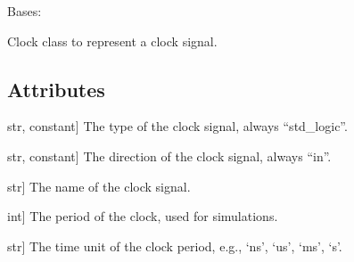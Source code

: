 \documentclass[letterpaper,10pt,english]{sphinxmanual}
\begin{document}
\begin{fulllineitems}
\label{\detokenize{a_signal:a_signal.Clock}}
\pysigstartsignatures
{}
\pysigstopsignatures
\sphinxAtStartPar
Bases: {\hyperref[\detokenize{a_signal:a_signal.Signal}]{}}

\sphinxAtStartPar
Clock class to represent a clock signal.


\subsection{Attributes}
\label{\detokenize{a_signal:attributes}}\begin{description}
\sphinxlineitem{type}{[}str, constant{]}
\sphinxAtStartPar
The type of the clock signal, always “std\_logic”.

\sphinxlineitem{direction}{[}str, constant{]}
\sphinxAtStartPar
The direction of the clock signal, always “in”.

\sphinxlineitem{name}{[}str{]}
\sphinxAtStartPar
The name of the clock signal.

\sphinxlineitem{period}{[}int{]}
\sphinxAtStartPar
The period of the clock, used for simulations.

\sphinxlineitem{unit}{[}str{]}
\sphinxAtStartPar
The time unit of the clock period, e.g., ‘ns’, ‘us’, ‘ms’, ‘s’.

\end{description}

\begin{fulllineitems}
\label{\detokenize{a_signal:a_signal.Clock.direction}}
\pysigstartsignatures
{}
\pysigstopsignatures
\end{fulllineitems}


\begin{fulllineitems}
\label{\detokenize{a_signal:a_signal.Clock.type}}
\pysigstartsignatures
{}
\pysigstopsignatures
\end{fulllineitems}


\end{fulllineitems}
\end{document}
